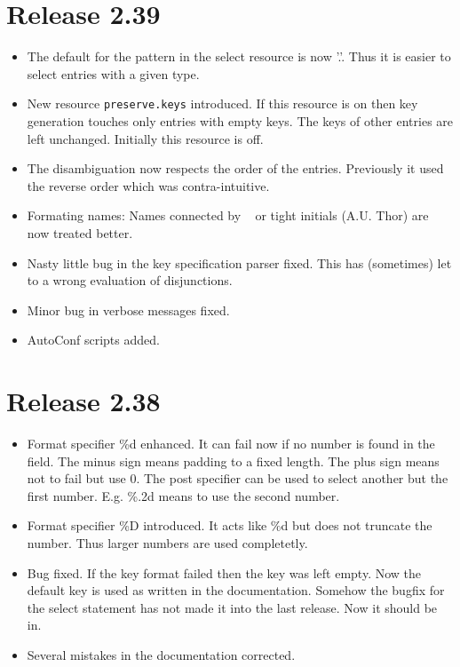 \documentclass[11pt,a4paper]{scrartcl}
\newcommand\rsc[1]{\texttt{#1}}
\newenvironment{Release}[2]{%
  \def\tmp{#2}%
  \section*{Release #1 \ifx\tmp\empty\else{\normalsize[#2]}\fi}
  \begin{itemize}
}{\end{itemize}}
\newenvironment{Fix}[1]{\item }{}
\newenvironment{New}[1]{\item }{}
\newenvironment{Doc}[1]{\item }{}
\newenvironment{Update}[1]{\item }{}
\begin{document}
\begin{multicols}
 \begin{Release}{2.39}{}
  \begin{Update}{gene}
    The default for the pattern in the select resource is now '.'.
    Thus it is easier to select entries with a given type.
  \end{Update}
  \begin{New}{gene}
    New resource \rsc{preserve.keys} introduced. If this resource is on
    then key generation touches only entries with empty keys. The keys of
    other entries are left unchanged. Initially this resource is off.
  \end{New}
  \begin{Update}{gene}
    The disambiguation now respects the order of the entries. Previously it
    used the reverse order which was contra-intuitive.
  \end{Update}
  \begin{Update}{gene}
    Formating names: Names connected by ~ or tight initials (A.U. Thor) are
    now treated better.
  \end{Update}
  \begin{Fix}{gene}
    Nasty little bug in the key specification parser fixed. This has
    (sometimes) let to a wrong evaluation of disjunctions.
  \end{Fix}
  \begin{Fix}{gene}
    Minor bug in verbose messages fixed.
  \end{Fix}
  \begin{New}{gene}
    AutoConf scripts added.
  \end{New}
 \end{Release}

 \begin{Release}{2.38}{}
  \begin{New}{gene}
    Format specifier \%d enhanced. It can fail now if no number is found in
    the field. The minus sign means padding to a fixed length. The plus sign
    means not to fail but use 0. The post specifier can be used to select
    another but the first number. E.g. \%.2d means to use the second number.
  \end{New}
  \begin{New}{gene}
    Format specifier \%D introduced. It acts like \%d but does not truncate
    the number. Thus larger numbers are used completetly.
  \end{New}
  \begin{Fix}{gene}
    Bug fixed. If the key format failed then the key was left empty. Now the
    default key is used as written in the documentation. Somehow the bugfix
    for the select statement has not made it into the last release. Now it
    should be in.
  \end{Fix}
  \begin{Doc}{gene}
    Several mistakes in the documentation corrected.
  \end{Doc}
 \end{Release}


\end{multicols}
\end{document}
